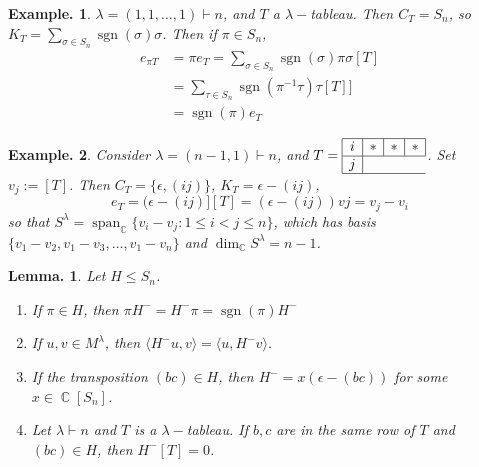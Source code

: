 \documentclass[11pt, a4paper]{memoir}
\DeclareMathOperator{\C}{{\mathbb{C}}}
\theoremstyle{change}
\newtheorem{lemma}[theorem]{Lemma.}
\theoremstyle{plain}
\theoremstyle{nonumberplain}
\newtheorem{example}{Example.}
\DeclareMathOperator{\spn}{span}
\DeclareMathOperator{\sgn}{sgn}
\numberwithin{equation}{section}
\begin{document}
\begin{example}
    $\lambda=(1,1,\ldots,1)\vdash n$, and $T$ a $\lambda-$tableau.
    Then $C_T=S_n$, so $K_T=\sum_{\sigma\in S_n}\sgn(\sigma)\sigma$.
    Then if $\pi\in S_n$,
    \begin{align*}
        e_{\pi T}&=\pi e_T=\sum_{\sigma\in S_n}\sgn(\sigma)\pi\sigma[T]\\
                 &= \sum_{\tau\in S_n}\sgn(\pi^{-1}\tau)\tau[T]]\\
                 &= \sgn(\pi)e_T
    \end{align*}
\end{example}
\begin{example}
    Consider $\lambda=(n-1,1)\vdash n$, and $T=\begin{array}{|c|c|c|c|}\hline i&*&*&*\\\hline j\\\hline\end{array}$.
    Set $v_j:=[T]$.
    Then $C_T=\{\epsilon,(ij)\}$, $K_T=\epsilon-(ij)$,
    \begin{equation*}
        e_T = (\epsilon-(ij)][T]=(\epsilon-(ij))vj=v_j-v_i
    \end{equation*}
    so that $S^\lambda=\spn_{\C}\{v_i-v_j:1\leq i<j\leq n\}$, which has basis $\{v_1-v_2,v_1-v_3,\ldots,v_1-v_n\}$ and $\dim_{\C} S^\lambda=n-1$.
\end{example}
\begin{lemma}
    Let $H\leq S_n$.
    \begin{enumerate}[nl]
        \item If $\pi\in H$, then $\pi H^-=H^-\pi=\sgn(\pi)H^-$
        \item If $u,v\in M^\lambda$, then $\langle H^-u,v\rangle=\langle u,H^-v\rangle$.
        \item If the transposition $(bc)\in H$, then $H^-=x(\epsilon-(bc))$ for some $x\in\C[S_n]$.
        \item Let $\lambda\vdash n$ and $T$ is a $\lambda-$tableau.
            If $b,c$ are in the same row of $T$ and $(bc)\in H$, then $H^-[T]=0$.
    \end{enumerate}
\end{lemma}
\end{document}
